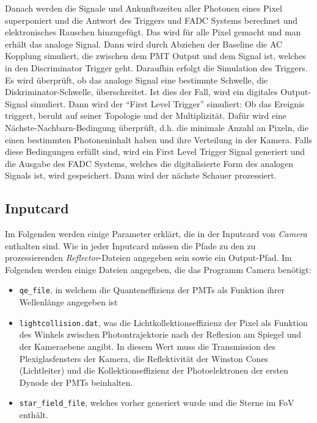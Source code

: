 Danach werden die Signale und Ankunftszeiten aller Photonen eines Pixel superponiert und die Antwort des Triggers und FADC Systems berechnet und elektronisches Rauschen hinzugefügt.
Das wird für alle Pixel gemacht und man erhält das analoge Signal.
Dann wird durch Abziehen der Baseline die AC Kopplung simuliert, die zwischen dem PMT Output und dem Signal ist, welches in den Discriminator Trigger geht.
Daraufhin erfolgt die Simulation des Triggers. 
Es wird überprüft, ob das analoge Signal eine bestimmte Schwelle, die Diskriminator-Schwelle, überschreitet.
Ist dies der Fall, wird ein digitales Output-Signal simuliert.
Dann wird der ``First Level Trigger'' simuliert:
Ob das Ereignis triggert, beruht auf seiner Topologie und der Multiplizität.
Dafür wird eine Nächste-Nachbarn-Bedingung überprüft, d.h. die minimale Anzahl an Pixeln, die einen bestimmten Photoneninhalt haben und ihre Verteilung in der Kamera.
Falls diese Bedingungen erfüllt sind, wird ein First Level Trigger Signal generiert und die Ausgabe des FADC Systems, welches die digitalisierte Form des analogen Signals ist, wird gespeichert.
Dann wird der nächste Schauer prozessiert.

\subsection{Inputcard}
Im Folgenden werden einige Parameter erklärt, die in der Inputcard von \textit{Camera} enthalten sind.
Wie in jeder Inputcard müssen die Pfade zu den zu prozessierenden \textit{Reflector}-Dateien angegeben sein sowie ein Output-Pfad.
Im Folgenden werden einige Dateien angegeben, die das Programm Camera benötigt:

\begin{itemize}
 \item \texttt{qe\_file}, in welchem die Quanteneffizienz der PMTs als Funktion ihrer Wellenlänge angegeben ist
 \item \texttt{lightcollision.dat}, was die Lichtkollektionseffizienz der Pixel als Funktion des Winkels zwischen Photontrajektorie nach der Reflexion am Spiegel und der Kameraebene angibt.
 In diesem Wert muss die Transmission des Plexiglasfensters der Kamera, die Reflektivität der Winston Cones (Lichtleiter) und die Kollektionseffizienz der Photoelektronen der ersten Dynode der PMTs beinhalten.
 \item \texttt{star\_field\_file}, welches vorher generiert wurde und die Sterne im FoV enthält.
\end{itemize}

